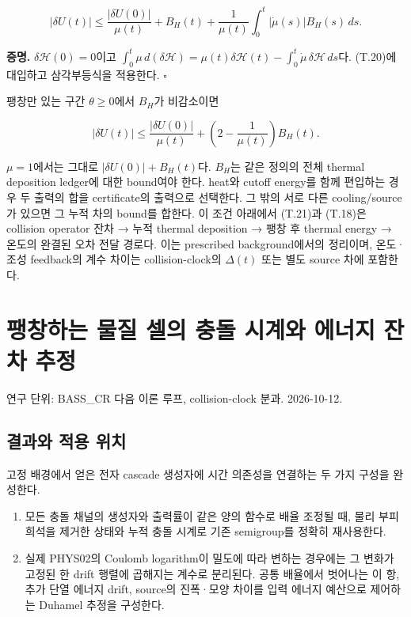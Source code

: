 \[
\boxed{
|\delta U(t)|\le
\frac{|\delta U(0)|}{\mu(t)}
+B_H(t)+\frac1{\mu(t)}
\int_0^t|\dot\mu(s)|B_H(s)\,ds .
}
\tag{T.21}
\]

\textbf{증명.} \(\delta\mathcal H(0)=0\)이고 \(\int_0^t\mu\,d(\delta\mathcal H) =\mu(t)\delta\mathcal H(t)-\int_0^t\dot\mu\,\delta\mathcal H\,ds\)다. (T.20)에 대입하고 삼각부등식을 적용한다. \(\square\)

팽창만 있는 구간 \(\theta\ge0\)에서 \(B_H\)가 비감소이면

\[
|\delta U(t)|\le
\frac{|\delta U(0)|}{\mu(t)}
+\left(2-\frac1{\mu(t)}\right)B_H(t).
\tag{T.22}
\]

\(\mu=1\)에서는 그대로 \(|\delta U(0)|+B_H(t)\)다. \(B_H\)는 같은 정의의 전체 thermal deposition ledger에 대한 bound여야 한다. heat와 cutoff energy를 함께 편입하는 경우 두 출력의 합을 certificate의 출력으로 선택한다. 그 밖의 서로 다른 cooling/source가 있으면 그 누적 차의 bound를 합한다. 이 조건 아래에서 (T.21)과 (T.18)은 collision operator 잔차 → 누적 thermal deposition → 팽창 후 thermal energy → 온도의 완결된 오차 전달 경로다. 이는 prescribed background에서의 정리이며, 온도·조성 feedback의 계수 차이는 collision-clock의 \(\Delta(t)\) 또는 별도 source 차에 포함한다.

\clearpage

\hypertarget{uxd33duxcc3duxd558uxb294-uxbb3cuxc9c8-uxc140uxc758-uxcda9uxb3cc-uxc2dcuxacc4uxc640-uxc5d0uxb108uxc9c0-uxc794uxcc28-uxcd94uxc815}{%
\section{팽창하는 물질 셀의 충돌 시계와 에너지 잔차 추정}\label{uxd33duxcc3duxd558uxb294-uxbb3cuxc9c8-uxc140uxc758-uxcda9uxb3cc-uxc2dcuxacc4uxc640-uxc5d0uxb108uxc9c0-uxc794uxcc28-uxcd94uxc815}}

연구 단위: BASS\_CR 다음 이론 루프, collision-clock 분과. 2026-10-12.

\hypertarget{uxacb0uxacfcuxc640-uxc801uxc6a9-uxc704uxce58}{%
\subsection{결과와 적용 위치}\label{uxacb0uxacfcuxc640-uxc801uxc6a9-uxc704uxce58}}

고정 배경에서 얻은 전자 cascade 생성자에 시간 의존성을 연결하는 두 가지 구성을 완성한다.

\begin{enumerate}
\def\labelenumi{\arabic{enumi}.}
\tightlist
\item
  모든 충돌 채널의 생성자와 출력률이 같은 양의 함수로 배율 조정될 때, 물리 부피 희석을 제거한 상태와 누적 충돌 시계로 기존 semigroup를 정확히 재사용한다.
\item
  실제 PHYS02의 Coulomb logarithm이 밀도에 따라 변하는 경우에는 그 변화가 고정된 한 drift 행렬에 곱해지는 계수로 분리된다. 공통 배율에서 벗어나는 이 항, 추가 단열 에너지 drift, source의 진폭·모양 차이를 입력 에너지 예산으로 제어하는 Duhamel 추정을 구성한다.
\end{enumerate}

